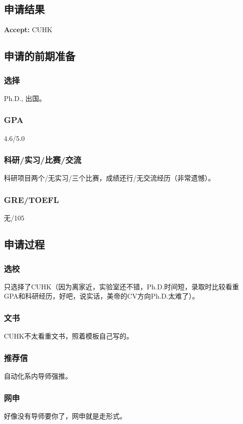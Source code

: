 \documentclass[a4paper,UTF8]{book}
\begin{document}
    \subsection*{申请结果}
        \textbf{Accept:} CUHK

    \subsection*{申请的前期准备}
        \subsubsection*{选择}
        Ph.D., 出国。
        \subsubsection*{GPA}
        4.6/5.0
        \subsubsection*{科研/实习/比赛/交流}
        科研项目两个/无实习/三个比赛，成绩还行/无交流经历（非常遗憾）。
        \subsubsection*{GRE/TOEFL}
        无/105

    \subsection*{申请过程}
        \subsubsection*{选校}
        只选择了CUHK（因为离家近，实验室还不错，Ph.D.时间短，录取时比较看重GPA和科研经历，好吧，说实话，美帝的CV方向Ph.D.太难了）。

        \subsubsection*{文书}
        CUHK不太看重文书，照着模板自己写的。

        \subsubsection*{推荐信}
        自动化系内导师强推。

        \subsubsection*{网申}
        好像没有导师要你了，网申就是走形式。
\end{document}
